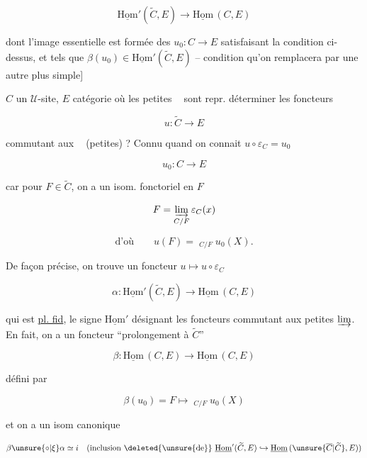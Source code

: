 \[
\underline{\mathrm{Hom}}'(\widetilde C,E)\longrightarrow\underline{\mathrm{Hom}}\,(C,E)
\]

dont l'image essentielle est formée des  $u_0\colon C\longrightarrow E$ satisfaisant la condition ci-dessus, et tels que $\beta(u_0)\in\underline{\mathrm{Hom}}'(\widetilde C,E)$ -- condition qu'on remplacera par une autre plus simple]

$C$ un $\mathcal U$-site, $E$ catégorie où les petites $\mathop{\underline{\lim}}$ sont repr. déterminer les foncteurs

\[
u\colon\widetilde C\longrightarrow E
\]

commutant aux $\mathop{\underline{\lim}}$ (petites) ? Connu  quand on connait $u\circ\varepsilon_C=u_0$

\[
u_0\colon C\longrightarrow E
\]


car pour $F\in\widetilde C$, on a un isom. fonctoriel en $F$

\[
F=\varinjlim_{C/F}\varepsilon_C(x)
\]

\[
\text{d'où}\qquad u(F)=\mathop{\underline{\lim}}_{C/F}u_0(X).
\]

De façon précise, on trouve un foncteur $u\longmapsto u\circ\varepsilon_C$

\[
\alpha\colon\underline{\mathrm{Hom}}'(\widetilde C,E)\longrightarrow\underline{\mathrm{Hom}}\,(C,E)
\]

qui est \uline{pl. fid}, le signe $\underline{\mathrm{Hom}}'$ désignant les foncteurs commutant aux petites $\varinjlim$. En fait, on a un foncteur ``prolongement à $\widetilde C$''

\[
\beta\colon\underline{\mathrm{Hom}}\,(C,E)\longrightarrow\underline{\mathrm{Hom}}\,(C,E)
\]

défini par

\[
\beta(u_0)=F\longmapsto\mathop{\underline{\lim}}_{C/F}u_0(X)
\]

et on a un isom canonique

\[
\beta\unsure{\circ|\xi}\alpha\simeq i\quad
(\text{inclusion }\deleted{\unsure{\text{de}}}\ \underline{\mathrm{Hom}}'(\widetilde C,E)\hookrightarrow\underline{\mathrm{Hom}}\,(\unsure{\overline C|\widetilde C},E))
\]

